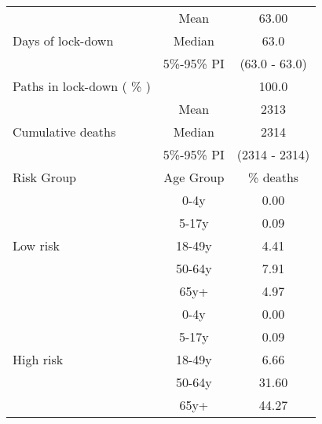 \documentclass{article}
\begin{document}
\begin{table}[th]
\centering
\begin{tabular}{p{4cm}cc}
\toprule
\multirow{3}{*}{Days   of lock-down} & Mean      & 63.00                        \\ \cmidrule(l){2-3} 
                                     & Median    & 63.0                      \\ \cmidrule(l){2-3} 
                                     & 5\%-95\% PI & (63.0 - 63.0)       \\ \midrule 
\multirow{1}{*}{Paths in lock-down ( \% )} &      &         100.0              \\   \midrule                     
\multirow{3}{\hsize}{Cumulative deaths}       & Mean      & 2313 \\ \cmidrule(l){2-3} 
                                     & Median    & 2314                        \\ \cmidrule(l){2-3} 
                                     & 5\%-95\% PI & (2314 - 2314)           \\  \midrule
Risk Group                           & Age Group & \multicolumn{1}{c}{\% deaths}        \\  \midrule
\multirow{5}{*}{Low   risk}          & 0-4y      & 0.00                         \\ \cmidrule(l){2-3} 
                                     & 5-17y     & 0.09                         \\ \cmidrule(l){2-3} 
                                     & 18-49y    & 4.41                         \\ \cmidrule(l){2-3} 
                                     & 50-64y    & 7.91                         \\ \cmidrule(l){2-3} 
                                     & 65y+      & 4.97                         \\ \midrule
\multirow{5}{*}{High   risk}         & 0-4y      & 0.00                         \\ \cmidrule(l){2-3} 
                                     & 5-17y     & 0.09                         \\ \cmidrule(l){2-3} 
                                     & 18-49y    & 6.66                         \\ \cmidrule(l){2-3} 
                                     & 50-64y    & 31.60                         \\ \cmidrule(l){2-3} 
                                     & 65y+      & 44.27                         \\ \midrule

\end{tabular}
\end{table}
\end{document}
